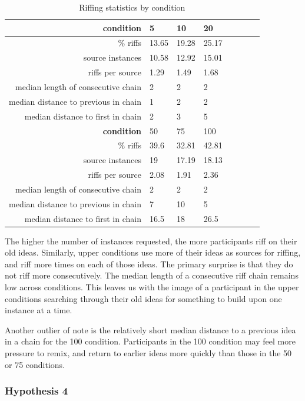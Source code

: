 \begin{table}
\begin{tabular}[h!]{r | l l l l l l l}
    \hline \hline \textbf{condition} & 5 & 10 & 20  \\ \hline \hline
    \% riffs & 13.65 & 19.28 & 25.17  \\
    source instances & 10.58 & 12.92 & 15.01 \\
    riffs per source & 1.29 & 1.49 & 1.68 \\
    median length of consecutive chain & 2 & 2 & 2 \\
    median distance to previous in chain & 1 & 2 & 2 \\
    median distance to first in chain & 2 & 3 & 5 \\ \hline \hline
    \textbf{condition} & 50 & 75 & 100 \\ \hline \hline
    \% riffs & 39.6 & 32.81 & 42.81 \\
    source instances & 19 & 17.19 & 18.13\\
    riffs per source & 2.08 & 1.91 & 2.36\\
    median length of consecutive chain & 2 & 2 & 2\\
    median distance to previous in chain & 7 & 10 & 5\\
    median distance to first in chain & 16.5 & 18 & 26.5 \\
    \end{tabular}
    \caption{Riffing statistics by condition}
\end{table}

The higher the number of instances requested, the more participants riff on their old ideas. Similarly, upper conditions use more of their ideas as sources for riffing, and riff more times on each of those ideas. The primary surprise is that they do not riff more consecutively. The median length of a consecutive riff chain remains low across conditions. This leaves us with the image of a participant in the upper conditions searching through their old ideas for something to build upon one instance at a time.

Another outlier of note is the relatively short median distance to a previous idea in a chain for the 100 condition. Participants in the 100 condition may feel more pressure to remix, and return to earlier ideas more quickly than those in the 50 or 75 conditions.

\subsubsection{Hypothesis 4}

